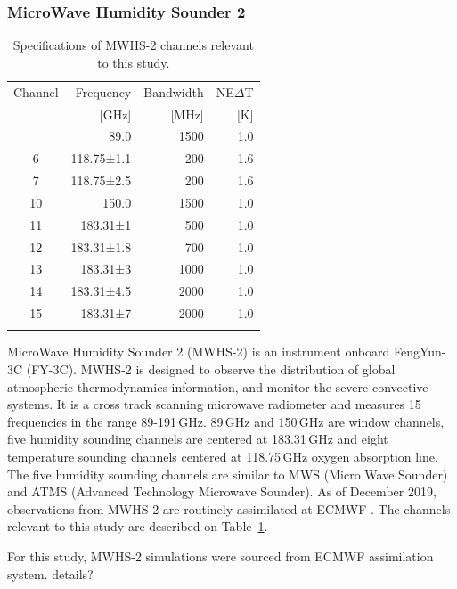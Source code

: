 \documentclass[amt]{copernicus}
\newcommand{\todo}[1]{{\color{red} #1}}
\begin{document}
\subsubsection{ MicroWave Humidity Sounder 2}
%
\begin{table}[t]
	\caption{Specifications of MWHS-2 channels relevant to this study.}
	\label{tab:specifications_MWHS2}	
	\begin{tabular}{crrr}
		\tophline
		Channel & Frequency 	& Bandwidth & NE$\Delta$T \\
		& [GHz]			& [MHz]		& [K]		\\
		\middlehline
		1	&	89.0   		  & 1500			&	1.0	\\
		6	&	118.75±1.1    & \phantom{0}200 	&	1.6\\
		7	&	118.75±2.5    & \phantom{0}200 	&	1.6\\
		10	&	150.0         & 1500 			&	1.0 \\
		11	&	183.31±1      & \phantom{0}500  &	1.0 \\
		12  & 	183.31±1.8    & \phantom{0}700 	&   1.0\\
		13  & 	183.31±3      & 1000    		&	1.0	\\
		14  & 	183.31±4.5    & 2000    		&	1.0\\
		15  & 	183.31±7      & 2000  			&	1.0  \\
		\bottomhline
	\end{tabular}
	\belowtable{} %
\end{table}
MicroWave Humidity Sounder 2 (MWHS-2) is an instrument onboard FengYun-3C (FY-3C). MWHS-2 is designed to observe the distribution of global atmospheric thermodynamics information, and monitor the severe convective systems. It is a cross track scanning microwave radiometer and measures 15 frequencies in the range 89-191\,GHz. 89\,GHz and 150\,GHz are window channels, five humidity sounding channels are centered at 183.31\,GHz and eight temperature sounding channels centered at 118.75\,GHz oxygen absorption line. The five humidity sounding channels are similar to MWS (Micro Wave Sounder) and ATMS (Advanced Technology Microwave Sounder). As of December 2019, observations from MWHS-2 are routinely assimilated at ECMWF \citep{duncan2020MWHS}. The channels relevant to this study are described on Table~\ref{tab:specifications_MWHS2}. 

For this study, MWHS-2 simulations were sourced from ECMWF assimilation system. \todo{details?}
\end{document}
